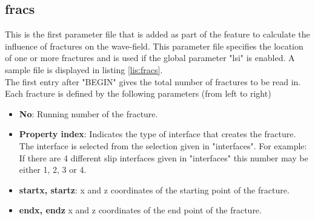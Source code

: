     \subsection{fracs}
    \label{subsec:fracs}
    	This is the first parameter file that is added as part of the feature to calculate the influence of fractures on the wave-field. This parameter file specifies the location of one or more fractures and is used if the global parameter "lsi" is enabled. A sample file is displayed in listing \ref{lis:fracs}.
    	 \\
    	The first entry after "BEGIN" gives the total number of fractures to be read in. \\
    	Each fracture is defined by the following parameters (from left to right)
    	\begin{itemize}
    		\item \textbf{No}: Running number of the fracture.
    		\item \textbf{Property index}: Indicates the type of interface that creates the fracture. The interface is selected from the selection given in "interfaces". For example: If there are 4 different slip interfaces given in "interfaces" this number may be either 1, 2, 3 or 4. 
    		\item \textbf{startx, startz}: x and z coordinates of the starting point of the fracture.
    		\item \textbf{endx, endz} x and z coordinates of the end point of the fracture.
    	\end{itemize}
